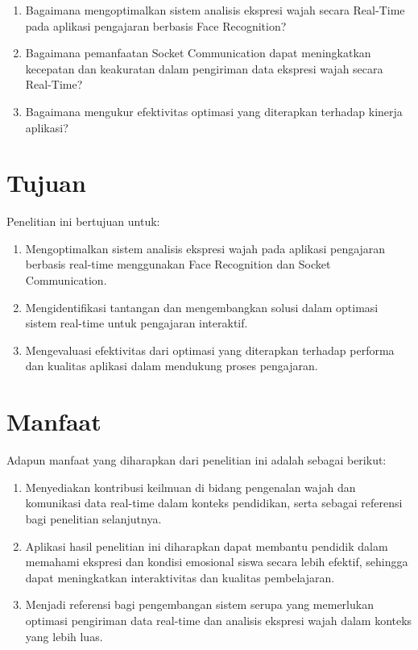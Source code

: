 \begin{enumerate}
  \item
    {Bagaimana mengoptimalkan sistem analisis ekspresi wajah secara Real-Time pada aplikasi pengajaran berbasis Face Recognition?}
  \item
    {Bagaimana pemanfaatan Socket Communication dapat meningkatkan kecepatan dan keakuratan dalam pengiriman data ekspresi wajah secara Real-Time?}
  \item
    {Bagaimana mengukur efektivitas optimasi yang diterapkan terhadap kinerja aplikasi?}
\end{enumerate}

\section{Tujuan}
{Penelitian ini bertujuan untuk:}

\begin{enumerate}
  \item
    {Mengoptimalkan sistem analisis ekspresi wajah pada aplikasi pengajaran berbasis real-time menggunakan Face Recognition dan Socket Communication.}
  \item
    {Mengidentifikasi tantangan dan mengembangkan solusi dalam optimasi sistem real-time untuk pengajaran interaktif.}
  \item
    {Mengevaluasi efektivitas dari optimasi yang diterapkan terhadap performa dan kualitas aplikasi dalam mendukung proses pengajaran.}
\end{enumerate}

\section{Manfaat}

{Adapun manfaat yang diharapkan dari penelitian ini adalah sebagai
berikut:}

\begin{enumerate}
  \item
    {Menyediakan kontribusi keilmuan di bidang pengenalan wajah dan komunikasi data real-time dalam konteks pendidikan, serta sebagai referensi bagi penelitian selanjutnya.}
  \item
    {Aplikasi hasil penelitian ini diharapkan dapat membantu pendidik
      dalam memahami ekspresi dan kondisi emosional siswa secara lebih
      efektif, sehingga dapat meningkatkan interaktivitas dan kualitas
    pembelajaran.}
  \item
    {Menjadi referensi bagi pengembangan sistem serupa yang memerlukan optimasi pengiriman data real-time dan analisis ekspresi wajah dalam konteks yang lebih luas.}
\end{enumerate}

